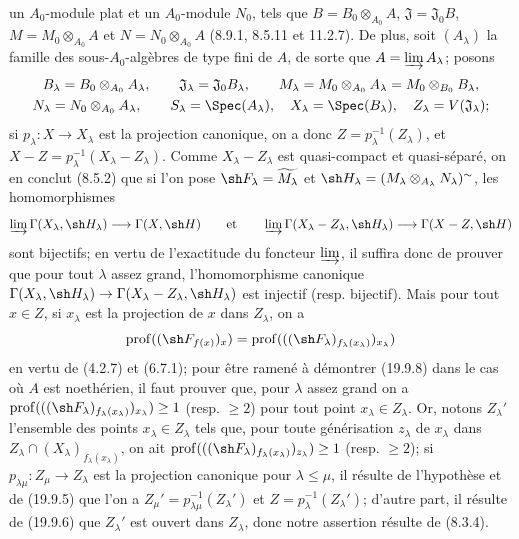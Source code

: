 un $A_0$-module plat et un $A_0$-module $N_0$, tels que $B=B_0\otimes_{A_0}A$, $\mathfrak J=\mathfrak J_0B$, $M=M_0\otimes_{A_0}A$ et $N=N_0\otimes_{A_0}A$ (8.9.1, 8.5.11 et 11.2.7). De plus, soit $(A_\lambda)$ la famille des sous-$A_0$-algèbres de type fini de $A$, de sorte que $A=\varinjlim A_\lambda$; posons
\[
\begin{gathered}
  B_\lambda=B_0\otimes_{A_0}A_\lambda,\qquad
  \mathfrak J_\lambda=\mathfrak J_0B_\lambda,\qquad
  M_\lambda=M_0\otimes_{A_0}A_\lambda=M_0\otimes_{B_0}B_\lambda,\\
  N_\lambda=N_0\otimes_{A_0}A_\lambda,\qquad
  S_\lambda=\Spec(A_\lambda),\quad
  X_\lambda=\Spec(B_\lambda),\quad
  Z_\lambda=V(\mathfrak J_\lambda);
\end{gathered}
\]
si $p_\lambda:X\to X_\lambda$ est la projection canonique, on a donc $Z=p_\lambda^{-1}(Z_\lambda)$, et $X-Z=p_\lambda^{-1}(X_\lambda-Z_\lambda)$. Comme $X_\lambda-Z_\lambda$ est quasi-compact et quasi-séparé, on en conclut (8.5.2) que si l'on pose $\sh F_\lambda=\widetilde{M_\lambda}$ et $\sh H_\lambda=(M_\lambda\otimes_{A_\lambda}N_\lambda)^\sim$, les homomorphismes
\[
  \varinjlim\Gamma(X_\lambda,\sh H_\lambda)\longrightarrow\Gamma(X,\sh H)
  \qquad\text{et}\qquad
  \varinjlim\Gamma(X_\lambda-Z_\lambda,\sh H_\lambda)\longrightarrow\Gamma(X-Z,\sh H)
\]
sont bijectifs; en vertu de l'exactitude du foncteur $\varinjlim$, il suffira donc de prouver que pour tout $\lambda$ assez grand, l'homomorphisme canonique $\Gamma(X_\lambda,\sh H_\lambda)\to\Gamma(X_\lambda-Z_\lambda,\sh H_\lambda)$ est injectif (resp. bijectif). Mais pour tout $x\in Z$, si $x_\lambda$ est la projection de $x$ dans $Z_\lambda$, on a
\[
  \operatorname{prof}((\sh F_{f(x)})_x)
  =\operatorname{prof}(((\sh F_\lambda)_{f_\lambda(x_\lambda)})_{x_\lambda})
\]
en vertu de (4.2.7) et (6.7.1); pour être ramené à démontrer (19.9.8) dans le cas où $A$ est noethérien, il faut prouver que, pour $\lambda$ assez grand on a $\operatorname{prof}(((\sh F_\lambda)_{f_\lambda(x_\lambda)})_{x_\lambda})\geq1$ (resp. $\geq2$) pour tout point $x_\lambda\in Z_\lambda$. Or, notons $Z_\lambda'$ l'ensemble des points $x_\lambda\in Z_\lambda$ tels que, pour toute générisation $z_\lambda$ de $x_\lambda$ dans $Z_\lambda\cap(X_\lambda)_{f_\lambda(x_\lambda)}$, on ait $\operatorname{prof}(((\sh F_\lambda)_{f_\lambda(x_\lambda)})_{z_\lambda})\geq1$ (resp. $\geq2$); si $p_{\lambda\mu}:Z_\mu\to Z_\lambda$ est la projection canonique pour $\lambda\leq\mu$, il résulte de l'hypothèse et de (19.9.5) que l'on a $Z_\mu'=p_{\lambda\mu}^{-1}(Z_\lambda')$ et $Z=p_\lambda^{-1}(Z_\lambda')$; d'autre part, il résulte de (19.9.6) que $Z_\lambda'$ est ouvert dans $Z_\lambda$, donc notre assertion résulte de (8.3.4).

